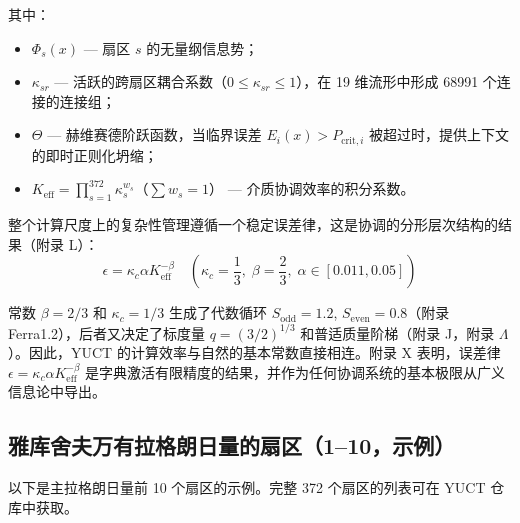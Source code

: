 \documentclass[11pt,a4paper]{article}
\begin{document}
	其中：
	\begin{itemize}
		\item \(\Phi_s(x)\) — 扇区 \(s\) 的无量纲信息势；
		\item \(\kappa_{sr}\) — 活跃的跨扇区耦合系数（\(0 \le \kappa_{sr} \le 1\)），在 19 维流形中形成 68991 个连接的连接组；
		\item \(\Theta\) — 赫维赛德阶跃函数，当临界误差 \(E_i(x) > P_{\text{crit},i}\) 被超过时，提供上下文的即时正则化坍缩；
		\item \(K_{\text{eff}} = \prod_{s=1}^{372} \kappa_s^{w_s}\)（\(\sum w_s = 1\)） — 介质协调效率的积分系数。
	\end{itemize}
	
	整个计算尺度上的复杂性管理遵循一个稳定误差律，这是协调的分形层次结构的结果（附录 L）：
	\begin{equation}
		\epsilon = \kappa_c \alpha K_{\text{eff}}^{-\beta} \quad \left(\kappa_c = \frac{1}{3}, \; \beta = \frac{2}{3}, \; \alpha \in [0.011, 0.05]\right)
	\end{equation}
	
	常数 \(\beta = 2/3\) 和 \(\kappa_c = 1/3\) 生成了代数循环 \(S_{\mathrm{odd}} = 1.2\), \(S_{\mathrm{even}} = 0.8\)（附录 Ferra1.2），后者又决定了标度量 \(q = (3/2)^{1/3}\) 和普适质量阶梯（附录 J，附录 \(\Lambda\)）。因此，YUCT 的计算效率与自然的基本常数直接相连。附录 X 表明，误差律 \(\epsilon = \kappa_c\alpha K_{\mathrm{eff}}^{-\beta}\) 是字典激活有限精度的结果，并作为任何协调系统的基本极限从广义信息论中导出。
	
	\subsection{雅库舍夫万有拉格朗日量的扇区（1–10，示例）}
	\label{sec:sectors}
	
	以下是主拉格朗日量前 10 个扇区的示例。完整 372 个扇区的列表可在 YUCT 仓库中获取。
	
\end{document}
